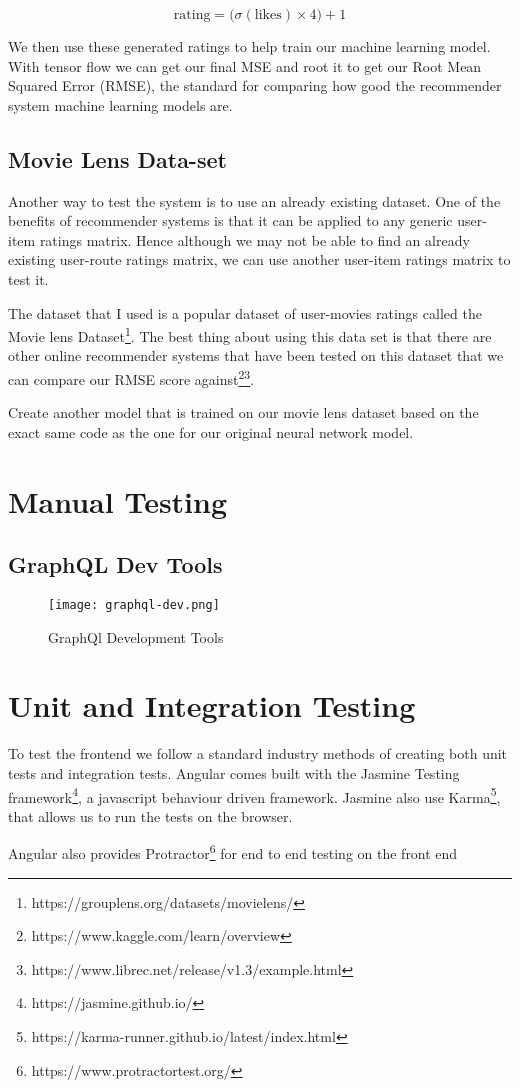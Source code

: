 \begin{equation} \label{eqn:RatingCalculation}
    \textrm{rating} = \big(\sigma(\textrm{likes}) \times 4\big) + 1
\end{equation}

We then use these generated ratings to help train our machine learning model. With tensor flow we can get our final MSE and root it to get our Root Mean Squared Error (RMSE), the standard for comparing how good the recommender system machine learning models are.

\subsection{Movie Lens Data-set}
Another way to test the system is to use an already existing dataset. One of the benefits of recommender systems is that it can be applied to any generic user-item ratings matrix. Hence although we may not be able to find an already existing user-route ratings matrix, we can use another user-item ratings matrix to test it.

The dataset that I used is a popular dataset of user-movies ratings called the Movie lens Dataset\footnote{https://grouplens.org/datasets/movielens/}. The best thing about using this data set is that there are other online recommender systems that have been tested on this dataset that we can compare our RMSE score against\footnote{https://www.kaggle.com/learn/overview}\footnote{https://www.librec.net/release/v1.3/example.html}.

Create another model that is trained on our movie lens dataset based on the exact same code as the one for our original neural network model.

\section{Manual Testing}
\subsection{GraphQL Dev Tools}
\begin{figure}[ht]
    \centering
    \texttt{[image: graphql-dev.png]}
    \caption{GraphQl Development Tools}
    \label{fig:graphQLDevTools}
\end{figure}

\section{Unit and Integration Testing}
To test the frontend we follow a standard industry methods of creating both unit tests and integration tests. Angular comes built with the Jasmine Testing framework\footnote{https://jasmine.github.io/}, a javascript behaviour driven framework. Jasmine also use Karma\footnote{https://karma-runner.github.io/latest/index.html}, that allows us to run the tests on the browser.

Angular also provides Protractor\footnote{https://www.protractortest.org/} for end to end testing on the front end